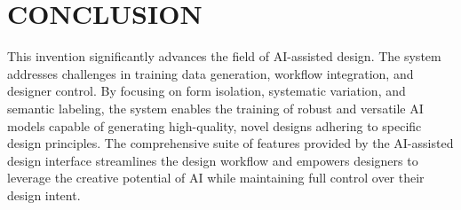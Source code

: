 \documentclass[12pt]{article}
\begin{document}
\section{CONCLUSION}

This invention significantly advances the field of AI-assisted design. The system addresses challenges in training data generation, workflow integration, and designer control. By focusing on form isolation, systematic variation, and semantic labeling, the system enables the training of robust and versatile AI models capable of generating high-quality, novel designs adhering to specific design principles. The comprehensive suite of features provided by the AI-assisted design interface streamlines the design workflow and empowers designers to leverage the creative potential of AI while maintaining full control over their design intent.
\end{document}
